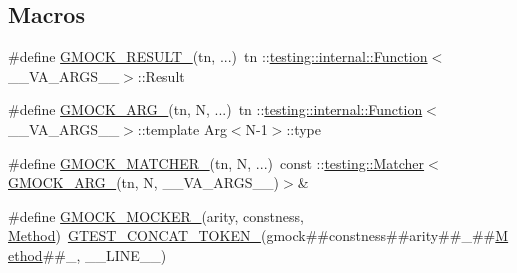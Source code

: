 \subsection*{Macros}
\begin{DoxyCompactItemize}
\item 
\#define \mbox{\hyperlink{_obj__test_2lib_2googletest-master_2googlemock_2include_2gmock_2gmock-generated-function-mockers_8h_a0e9d94e9c77df84f1103af06feee1077}{G\+M\+O\+C\+K\+\_\+\+R\+E\+S\+U\+L\+T\+\_\+}}(tn, ...)~tn \+::\mbox{\hyperlink{structtesting_1_1internal_1_1_function}{testing\+::internal\+::\+Function}}$<$\+\_\+\+\_\+\+V\+A\+\_\+\+A\+R\+G\+S\+\_\+\+\_\+$>$\+::Result
\item 
\#define \mbox{\hyperlink{_obj__test_2lib_2googletest-master_2googlemock_2include_2gmock_2gmock-generated-function-mockers_8h_a887575cc1c31158fba808180a10c004f}{G\+M\+O\+C\+K\+\_\+\+A\+R\+G\+\_\+}}(tn,  N, ...)~tn \+::\mbox{\hyperlink{structtesting_1_1internal_1_1_function}{testing\+::internal\+::\+Function}}$<$\+\_\+\+\_\+\+V\+A\+\_\+\+A\+R\+G\+S\+\_\+\+\_\+$>$\+::template Arg$<$N-\/1$>$\+::type
\item 
\#define \mbox{\hyperlink{_obj__test_2lib_2googletest-master_2googlemock_2include_2gmock_2gmock-generated-function-mockers_8h_aa87d0009fe91f1c89d658776b55a769c}{G\+M\+O\+C\+K\+\_\+\+M\+A\+T\+C\+H\+E\+R\+\_\+}}(tn,  N, ...)~const \+::\mbox{\hyperlink{classtesting_1_1_matcher}{testing\+::\+Matcher}}$<$\mbox{\hyperlink{_obj__test_2lib_2googletest-release-1_88_81_2googlemock_2include_2gmock_2gmock-generated-function-mockers_8h_a887575cc1c31158fba808180a10c004f}{G\+M\+O\+C\+K\+\_\+\+A\+R\+G\+\_\+}}(tn, N, \+\_\+\+\_\+\+V\+A\+\_\+\+A\+R\+G\+S\+\_\+\+\_\+)$>$\&
\item 
\#define \mbox{\hyperlink{_obj__test_2lib_2googletest-master_2googlemock_2include_2gmock_2gmock-generated-function-mockers_8h_a7d362499e27b1bc3a9806dd3cf58a5b7}{G\+M\+O\+C\+K\+\_\+\+M\+O\+C\+K\+E\+R\+\_\+}}(arity,  constness,  \mbox{\hyperlink{_obj__test_2lib_2googletest-release-1_88_81_2googlemock_2test_2gmock-spec-builders__test_8cc_a95606368148f3e5aab5db46c32466afd}{Method}})~\mbox{\hyperlink{_obj__test_2lib_2googletest-release-1_88_81_2googletest_2include_2gtest_2internal_2gtest-internal_8h_ae3c336cbe1ae2bd1b1d019333e4428a0}{G\+T\+E\+S\+T\+\_\+\+C\+O\+N\+C\+A\+T\+\_\+\+T\+O\+K\+E\+N\+\_\+}}(gmock\#\#constness\#\#arity\#\#\+\_\+\#\#\mbox{\hyperlink{_obj__test_2lib_2googletest-release-1_88_81_2googlemock_2test_2gmock-spec-builders__test_8cc_a95606368148f3e5aab5db46c32466afd}{Method}}\#\#\+\_\+, \+\_\+\+\_\+\+L\+I\+N\+E\+\_\+\+\_\+)

\end{DoxyCompactItemize}
